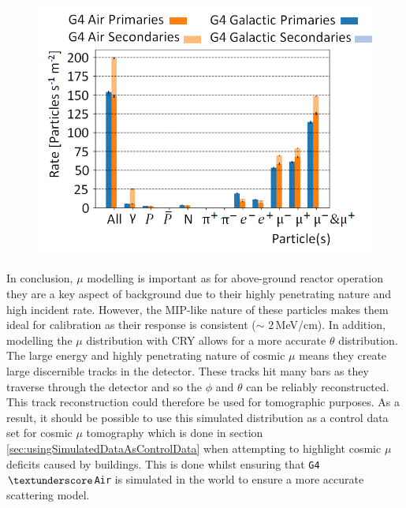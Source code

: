\begin{figure}[!h]
 \centering
 \includegraphics[width=0.7\linewidth]{Chapter4/Figs/Raster/CryPlots/CRY_ratesMedText.png}
 \label{fig:CRY_rates}
\end{figure}

In conclusion, $\mu$ modelling is important as for above-ground reactor operation they are a key aspect of background due to their highly penetrating nature and high incident rate. However, the MIP-like nature of these particles makes them ideal for calibration as their response is consistent ($\sim$ 2\,MeV/cm). In addition, modelling the $\mu$ distribution with CRY \cite{ieee_cry_2007} allows for a more accurate $\theta$ distribution. The large energy and highly penetrating nature of cosmic $\mu$ means they create large discernible tracks in the detector. These tracks hit many bars as they traverse through the detector and so the $\phi$ and $\theta$ can be reliably reconstructed. This track reconstruction could therefore be used for tomographic purposes. As a result, it should be possible to use this simulated distribution as a control data set for cosmic $\mu$ tomography which is done in section \ref{sec:usingSimulatedDataAsControlData} when attempting to highlight cosmic $\mu$ deficits caused by buildings. This is done whilst ensuring that \texttt{G4$\textunderscore$Air} is simulated in the world to ensure a more accurate scattering model. 

